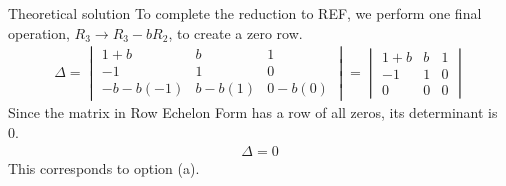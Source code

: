\documentclass{beamer}
\numberwithin{equation}{section}
\theoremstyle{remark}
\newcommand{\mydet}[1]{\ensuremath{\begin{vmatrix}#1\end{vmatrix}}}
\begin{document}
	\begin{frame}{Theoretical solution}
		To complete the reduction to REF, we perform one final operation, $R_3 \to R_3 - bR_2$, to create a zero row.
		\begin{align}
			\Delta = \mydet{1+b & b & 1 \\ -1 & 1 & 0 \\ -b - b(-1) & b-b(1) & 0-b(0)} = \mydet{1+b & b & 1 \\ -1 & 1 & 0 \\ 0 & 0 & 0}
		\end{align}
		Since the matrix in Row Echelon Form has a row of all zeros, its determinant is 0.
		\begin{align}
			\Delta = 0
		\end{align}
		This corresponds to option (a).
	\end{frame}
	
\end{document}
